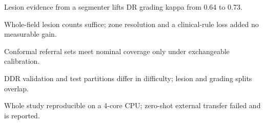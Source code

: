 \item Lesion evidence from a segmenter lifts DR grading kappa from 0.64 to 0.73.
\item Whole-field lesion counts suffice; zone resolution and a clinical-rule loss added no measurable gain.
\item Conformal referral sets meet nominal coverage only under exchangeable calibration.
\item DDR validation and test partitions differ in difficulty; lesion and grading splits overlap.
\item Whole study reproducible on a 4-core CPU; zero-shot external transfer failed and is reported.
